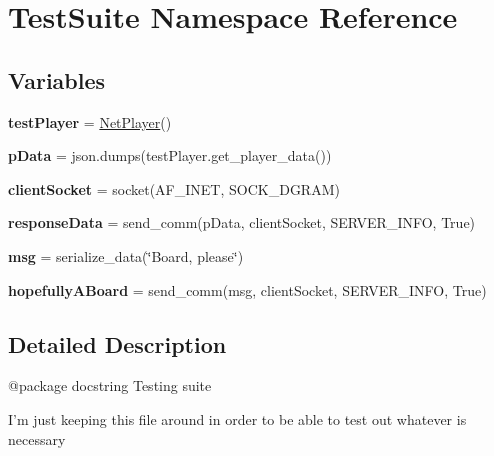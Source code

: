 \hypertarget{namespace_test_suite}{}\section{Test\+Suite Namespace Reference}
\label{namespace_test_suite}
\subsection*{Variables}
\begin{DoxyCompactItemize}
\item 
\mbox{\label{namespace_test_suite_a803da52019f6bc338a584faacc2ca3ca}} 
{\bfseries test\+Player} = \hyperlink{class_net_player_1_1_net_player}{Net\+Player}()
\item 
\mbox{\label{namespace_test_suite_a7c96470adc0052ea780e8b0abea02198}} 
{\bfseries p\+Data} = json.\+dumps(test\+Player.\+get\+\_\+player\+\_\+data())
\item 
\mbox{\label{namespace_test_suite_a5ec887ca5d1dbef4d74d18a8e1808cee}} 
{\bfseries client\+Socket} = socket(A\+F\+\_\+\+I\+N\+ET, S\+O\+C\+K\+\_\+\+D\+G\+R\+AM)
\item 
\mbox{\label{namespace_test_suite_a32ec223ae3857f6deae9bbedea77ea49}} 
{\bfseries response\+Data} = send\+\_\+comm(p\+Data, client\+Socket, S\+E\+R\+V\+E\+R\+\_\+\+I\+N\+FO, True)
\item 
\mbox{\label{namespace_test_suite_a67467e0fe0b70469b9d84fb41c15ad86}} 
{\bfseries msg} = serialize\+\_\+data(\char`\"{}Board, please\char`\"{})
\item 
\mbox{\label{namespace_test_suite_a01df54808b4e4878427cbeceb0a566d7}} 
{\bfseries hopefully\+A\+Board} = send\+\_\+comm(msg, client\+Socket, S\+E\+R\+V\+E\+R\+\_\+\+I\+N\+FO, True)
\end{DoxyCompactItemize}


\subsection{Detailed Description}
\begin{DoxyVerb}@package docstring
Testing suite

I'm just keeping this file around in order to be able to test out whatever
is necessary
\end{DoxyVerb}
 